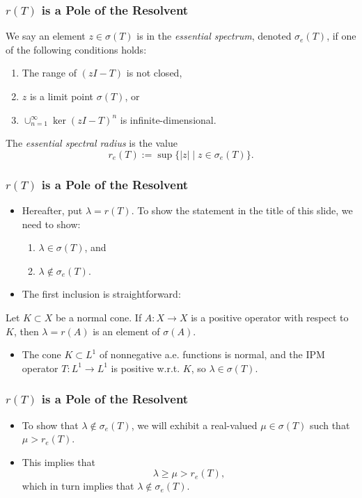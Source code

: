 \documentclass{beamer}
\begin{document}
\begin{frame}
	\frametitle{$r(T)$ is a Pole of the Resolvent}
	\begin{definition}
		We say an element $z \in \sigma(T)$ is in the \emph{essential spectrum}, denoted $\sigma_e(T)$, if one of the following conditions holds:
		\begin{enumerate}
			\pause
			\item The range of $(zI - T)$ is not closed,
			\pause
			\item $z$ is a limit point $\sigma(T)$, or
			\pause
			\item $\cup_{n=1}^\infty \ker(zI - T)^n$ is infinite-dimensional.
		\end{enumerate}
			\pause
			The \emph{essential spectral radius} is the value
			\[r_e(T) := \sup\{|z| \mid z \in \sigma_e(T)\}.\]
	\end{definition}
\end{frame}

\begin{frame}
	\frametitle{$r(T)$ is a Pole of the Resolvent}
	\begin{itemize}
		\item Hereafter, put $\lambda = r(T)$. To show the statement in the title of this slide, we need to show:
		\begin{enumerate}
			\pause
			\item $\lambda \in \sigma(T)$, and
			\pause
			\item $\lambda \not \in \sigma_e(T)$.
		\end{enumerate}
	\pause
	\item The first inclusion is straightforward:
	\end{itemize}
	\pause
	\begin{theorem}
		Let $K \subset X$ be a normal cone. If $A:X \to X$ is a positive operator with respect to $K$, then $\lambda = r(A)$ is an element of $\sigma(A)$.
	\end{theorem}
	\pause
	\begin{itemize}
		\item The cone $K \subset L^1$ of nonnegative a.e. functions is normal, and the IPM operator $T:L^1 \to L^1$ is positive w.r.t. $K$, so $\lambda \in \sigma(T)$.
	\end{itemize}
\end{frame}

\begin{frame}
	\frametitle{$r(T)$ is a Pole of the Resolvent}
	\begin{itemize}
		\item To show that $\lambda \not \in \sigma_e(T)$, we will exhibit a real-valued $\mu \in \sigma(T)$ such that $\mu > r_e(T)$.
		\pause
		\item This implies that
		\[\lambda \geq \mu > r_e(T),\]
		\pause
		which in turn implies that $\lambda \not \in \sigma_e(T)$.
	\end{itemize}
\end{frame}
\end{document}
